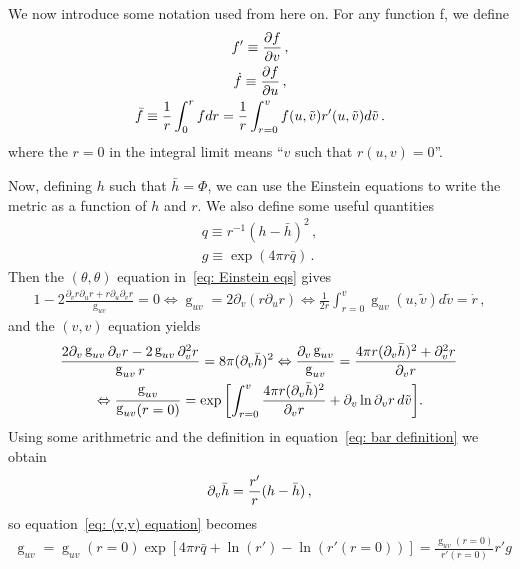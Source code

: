 \documentclass[11pt]{article}
\DeclareMathOperator{\g}{g}
\begin{document}
We now introduce some notation used from here on. For any function f, we define
\begin{gather}
    f' \equiv \frac{\partial f}{\partial v} \, ,\\
    \dot f \equiv \frac{\partial f}{\partial u} \, , \\
    \Bar{f} \equiv \frac{1}{r}\int_0^r f dr = \frac{1}{r}\int_{r=0}^v f(u,\tilde{v}) r'(u,\tilde{v}) d\tilde{v}\, .\label{eq: bar definition}
\end{gather}
where the $r=0$ in the integral limit means ``$v$ such that $r(u,v)=0$''.

Now, defining $h$ such that $\bar h = \Phi$, we can use the Einstein equations to write the metric as a function of $h$ and $r$. We also define some useful quantities
\begin{gather}
    q \equiv r^{-1}(h-\bar h)^2 \, ,\\
    g \equiv \exp{(4\pi r \bar q)} \, .
\end{gather}
Then the $(\theta,\theta)$ equation in~\eqref{eq: Einstein eqs} gives
\begin{align}
    1- 2\frac{\partial_v r\partial_u r + r \partial_u\partial_v r}{\g_{uv}} = 0 \Leftrightarrow
    \g_{uv} = 2 \partial_v (r \partial_u r) \Leftrightarrow 
    \frac{1}{2r}\int_{r=0}^v \g_{uv}(u,\tilde{v}) d\tilde{v} = \dot r \, , \label{eq: g_uv rdot}
\end{align}
and the $(v,v)$ equation yields
\begin{gather}
    \frac{2 \partial_v \g_{uv}\partial_v r - 2\g_{uv}\partial_v^2 r}{\g_{uv}r} = 8\pi(\partial_v \bar h)^2 \Leftrightarrow \frac{\partial_v \g_{uv}}{\g_{uv}} = \frac{4\pi r (\partial_v \bar h)^2 + \partial_v^2 r}{\partial_v r} \,\notag\\
    \Leftrightarrow \frac{\g_{uv}}{\g_{uv}(r=0)} = \exp{\left[\int_{r=0}^v \frac{4\pi r (\partial_v \bar h)^2}{\partial_v r} + \partial_v \ln{\partial_v r}\,d\tilde{v}\right]} .\label{eq: (v,v) equation}
\end{gather}
Using some arithmetric and the definition in equation~\eqref{eq: bar definition} we obtain
\begin{align}
    \partial_v \Bar{h} = \frac{r'}{r}(h-\Bar{h}) \, , \label{eq: partial_v of hbar}
\end{align}
so equation~\eqref{eq: (v,v) equation} becomes 
\begin{gather}
    \g_{uv} = \g_{uv}(r=0)\exp{\left[4\pi r \bar{q} + \ln{(r')} - \ln{(r'(r=0))}\right]} = \frac{\g_{uv}(r=0)}{r'(r=0)} r'g \label{eq: g_uv almost}
\end{gather}
\end{document}
